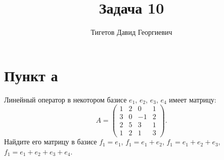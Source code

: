 \documentclass[12pt]{article}
\begin{document}
    \title{Задача 10}
    \author{Тигетов Давид Георгиевич}
    \date{}
    \maketitle

    \section*{Пункт а}
    Линейный оператор в некотором базисе $e_1$, $e_2$, $e_3$, $e_4$ имеет матрицу:
    \[
        A
        =
        \begin{pmatrix}
            1 & 2 & 0  & 1 \\
            3 & 0 & -1 & 2 \\
            2 & 5 & 3  & 1 \\
            1 & 2 & 1  & 3
        \end{pmatrix} .
    \]
    Найдите его матрицу в базисе $f_1 = e_1$, $f_1 = e_1 + e_2$, $f_1 = e_1 + e_2 + e_3$, $f_1 = e_1 + e_2 + e_3 + e_4$.
\end{document}
